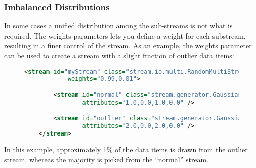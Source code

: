 \subsubsection{Imbalanced Distributions}
In some cases a unified distribution among the sub-streams is not what
is required. The {\ttfamily weights} parameters lets you define a
weight for each substream, resulting in a finer control of the
stream. As an example, the {\ttfamily weights} parameter can be used
to create a stream with a slight fraction of outlier data items:

\begin{figure}[h!]
  \centering
  \begin{lstlisting}[language=XML]
    <stream id="myStream" class="stream.io.multi.RandomMultiStream"
            weights="0.99,0.01">

        <stream id="normal" class="stream.generator.GaussianStream"
                attributes="1.0,0.0,1.0,0.0" />

        <stream id="outlier" class="stream.generator.GaussianStream"
                attributes="2.0,0.0,2.0,0.0" />
    </stream>
  \end{lstlisting}
\end{figure}
In this example, approximately 1\% of the data items is drawn from the
outlier stream, whereas the majority is picked from the ``normal''
stream.
